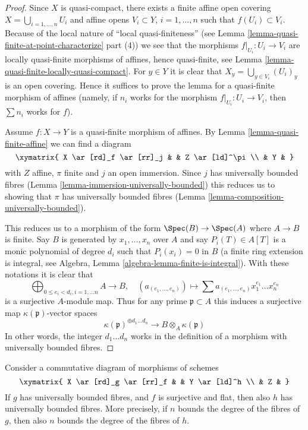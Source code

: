 \begin{proof}
Since $X$ is quasi-compact, there exists a finite affine open covering
$X = \bigcup_{i = 1, \ldots, n} U_i$ and affine opens $V_i \subset Y$,
$i = 1, \ldots, n$ such that $f(U_i) \subset V_i$.
Because of the local nature of ``local quasi-finiteness''
(see Lemma \ref{lemma-quasi-finite-at-point-characterize} part (4))
we see that the morphisms $f|_{U_i} : U_i \to V_i$ are locally
quasi-finite morphisms of affines, hence quasi-finite, see
Lemma \ref{lemma-quasi-finite-locally-quasi-compact}.
For $y \in Y$ it is clear that $X_y = \bigcup_{y \in V_i} (U_i)_y$
is an open covering. Hence it suffices to prove the lemma
for a quasi-finite morphism of affines (namely, if $n_i$ works
for the morphism $f|_{U_i} : U_i \to V_i$, then $\sum n_i$
works for $f$).

\medskip\noindent
Assume $f : X \to Y$ is a quasi-finite morphism of affines.
By Lemma \ref{lemma-quasi-finite-affine}
we can find a diagram
$$
\xymatrix{
X \ar[rd]_f \ar[rr]_j & & Z \ar[ld]^\pi \\
& Y &
}
$$
with $Z$ affine, $\pi$ finite and $j$ an open immersion. Since
$j$ has universally bounded fibres
(Lemma \ref{lemma-immersion-universally-bounded})
this reduces us to showing that $\pi$ has universally bounded
fibres (Lemma \ref{lemma-composition-universally-bounded}).

\medskip\noindent
This reduces us to a morphism of the form
$\Spec(B) \to \Spec(A)$ where
$A \to B$ is finite. Say $B$ is generated by $x_1, \ldots, x_n$
over $A$ and say $P_i(T) \in A[T]$ is a monic polynomial of degree
$d_i$ such that $P_i(x_i) = 0$ in $B$ (a finite ring extension
is integral, see
Algebra, Lemma \ref{algebra-lemma-finite-is-integral}).
With these notations it is clear that
$$
\bigoplus_{0 \leq e_i < d_i, i = 1, \ldots n} A
\longrightarrow
B, \quad
(a_{(e_1, \ldots, e_n)}) \longmapsto
\sum a_{(e_1, \ldots, e_n)} x_1^{e_1} \ldots x_n^{e_n}
$$
is a surjective $A$-module map. Thus for any prime $\mathfrak p \subset A$
this induces a surjective map $\kappa(\mathfrak p)$-vector spaces
$$
\kappa(\mathfrak p)^{\oplus d_1 \ldots d_n} \longrightarrow
B \otimes_A \kappa(\mathfrak p)
$$
In other words, the integer $d_1 \ldots d_n$ works in the definition
of a morphism with universally bounded fibres.
\end{proof}

\begin{lemma}
\label{lemma-universally-bounded-permanence}
Consider a commutative diagram of morphisms of schemes
$$
\xymatrix{
X \ar[rd]_g \ar[rr]_f & & Y \ar[ld]^h \\
& Z &
}
$$
If $g$ has universally bounded fibres, and $f$ is surjective and flat,
then also $h$ has universally bounded fibres. More precisely, if $n$
bounds the degree of the fibres of $g$, then also $n$ bounds the
degree of the fibres of $h$.
\end{lemma}

